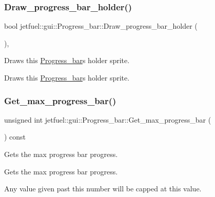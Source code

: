 \subsubsection{\texorpdfstring{Draw\+\_\+progress\+\_\+bar\+\_\+holder()}{Draw\_progress\_bar\_holder()}}
{\footnotesize\ttfamily bool jetfuel\+::gui\+::\+Progress\+\_\+bar\+::\+Draw\+\_\+progress\+\_\+bar\+\_\+holder (\begin{DoxyParamCaption}{ }\end{DoxyParamCaption})\hspace{0.3cm}{\ttfamily [inline]}, {\ttfamily [protected]}}



Draws this \hyperlink{classjetfuel_1_1gui_1_1Progress__bar}{Progress\+\_\+bar}\textquotesingle{}s holder sprite. 

Draws this \hyperlink{classjetfuel_1_1gui_1_1Progress__bar}{Progress\+\_\+bar}\textquotesingle{}s holder sprite. \mbox{\label{classjetfuel_1_1gui_1_1Progress__bar_a6c9fdfbed3600490da1a9f1fb4a76003}} 
\subsubsection{\texorpdfstring{Get\+\_\+max\+\_\+progress\+\_\+bar()}{Get\_max\_progress\_bar()}}
{\footnotesize\ttfamily unsigned int jetfuel\+::gui\+::\+Progress\+\_\+bar\+::\+Get\+\_\+max\+\_\+progress\+\_\+bar (\begin{DoxyParamCaption}{ }\end{DoxyParamCaption}) const\hspace{0.3cm}{\ttfamily [inline]}}



Gets the max progress bar progress. 

Gets the max progress bar progress.

Any value given past this number will be capped at this value. \mbox{\label{classjetfuel_1_1gui_1_1Progress__bar_ac8399712a5a25311f8f618ed33f730dc}} 
